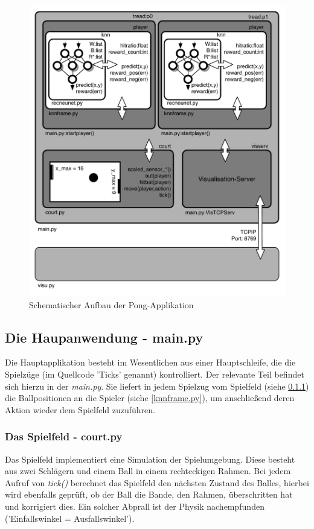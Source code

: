 \documentclass[12pt,twoside]{article}
\theoremstyle{plain}
\theoremstyle{definition}
\theoremstyle{remark}
\begin{document}
\begin{figure}[hbtp]
	 \centerline{\includegraphics[]{ApplicationArchitecture.pdf}}
	 {\caption{Schematischer Aufbau der Pong-Applikation}\label{fig:ApplicationArchitecture}}
\end{figure}


\subsection{Die Haupanwendung - main.py}
\label{main.py}

Die Hauptapplikation besteht im Wesentlichen aus einer Hauptschleife, die die Spielzüge (im Quellcode 'Ticks' genannt) kontrolliert. Der relevante Teil befindet sich hierzu in der \textit{main.py}.
Sie liefert in jedem Spielzug vom Spielfeld (siehe \ref{court.py}) die Ballpositionen an die Spieler (siehe \ref{knnframe.py}), um anschließend deren Aktion wieder dem Spielfeld zuzuführen.

\subsubsection{Das Spielfeld - court.py}
\label{court.py}
Das Spielfeld implementiert eine Simulation der Spielumgebung. Diese besteht aus zwei Schlägern und einem Ball in einem rechteckigen Rahmen. Bei jedem Aufruf von \textit{tick()} berechnet das Spielfeld den nächsten Zustand des Balles, hierbei wird ebenfalls geprüft, ob der Ball die Bande, den Rahmen, überschritten hat und korrigiert dies. Ein solcher Abprall ist der Physik nachempfunden ('Einfallswinkel = Ausfallswinkel').
\end{document}
